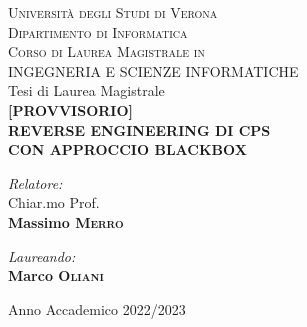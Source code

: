 \documentclass[a4paper,12pt,openright,twoside,titlepage]{book}
\begin{document}
\begin{titlepage}
	\begin{center}
		\thispagestyle{empty}
		
		
		
		\textsc{\LARGE Università degli Studi di Verona}\\
		\textsc{Dipartimento di Informatica}\\[1.0cm]
		\textsc{\large Corso di Laurea Magistrale in \\ 
			INGEGNERIA E SCIENZE INFORMATICHE}\\[2.0cm]
		
		\large Tesi di Laurea Magistrale \\[1.5cm]
		
		{ \Large \bfseries [PROVVISORIO] \\
			REVERSE ENGINEERING DI CPS \\ 
			CON APPROCCIO BLACKBOX \\[4.0cm] }
		
		\begin{minipage}[t]{0.4\textwidth}
			\begin{flushleft} \large
				\emph{Relatore:}\\
				Chiar.mo Prof. \\
				\textbf{Massimo \textsc{Merro}}
			\end{flushleft}
		\end{minipage}
		\begin{minipage}[t]{0.4\textwidth}\raggedleft
			\begin{flushright} \large
				\emph{Laureando:} \\
				\textbf{Marco \textsc{Oliani}} 
			\end{flushright}
		\end{minipage}
		
		\vfill
		
		{\large Anno Accademico 2022/2023}
		
	\end{center}
\end{titlepage}
\end{document}
